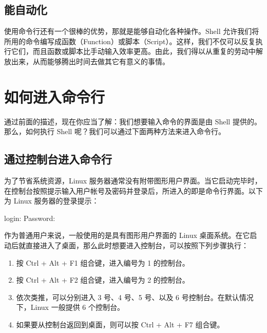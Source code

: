 \documentclass[]{ctexbook}
\newenvironment{Shaded}{\begin{snugshade}}{\end{snugshade}}
\newcommand{\ExtensionTok}[1]{#1}
\newcommand{\NormalTok}[1]{#1}
\begin{document}
\hypertarget{ux80fdux81eaux52a8ux5316}{%
\subsection{能自动化}\label{ux80fdux81eaux52a8ux5316}}

使用命令行还有一个很棒的优势，那就是能够自动化各种操作。Shell 允许我们将所用的命令编写成函数（Function）或脚本（Script）。这样，我们不仅可以反复执行它们，而且函数或脚本比手动输入效率更高。由此，我们得以从重复的劳动中解放出来，从而能够腾出时间去做其它有意义的事情。

\begin{Shaded}
\end{Shaded}

\hypertarget{ux5982ux4f55ux8fdbux5165ux547dux4ee4ux884c}{%
\section{如何进入命令行}\label{ux5982ux4f55ux8fdbux5165ux547dux4ee4ux884c}}

通过前面的描述，现在你应当了解：我们想要输入命令的界面是由 Shell 提供的。那么，如何执行 Shell 呢？我们可以通过下面两种方法来进入命令行。

\hypertarget{ux901aux8fc7ux63a7ux5236ux53f0ux8fdbux5165ux547dux4ee4ux884c}{%
\subsection{通过控制台进入命令行}\label{ux901aux8fc7ux63a7ux5236ux53f0ux8fdbux5165ux547dux4ee4ux884c}}

为了节省系统资源，Linux 服务器通常没有附带图形用户界面。当它启动完毕时，在控制台按照提示输入用户帐号及密码并登录后，所进入的即是命令行界面。以下为 Linux 服务器的登录提示：

\begin{Shaded}
\begin{Highlighting}[]
\ExtensionTok{login}\NormalTok{:}
\ExtensionTok{Password}\NormalTok{:}
\end{Highlighting}
\end{Shaded}

作为普通用户来说，一般使用的是具有图形用户界面的 Linux 桌面系统。在它启动后就直接进入了桌面，那么此时想要进入控制台，可以按照下列步骤执行：

\begin{enumerate}
\def\labelenumi{\arabic{enumi}.}
\item
  按 Ctrl + Alt + F1 组合键，进入编号为 1 的控制台。
\item
  按 Ctrl + Alt + F2 组合键，进入编号为 2 的控制台。
\item
  依次类推，可以分别进入 3 号、4 号、5 号、以及 6 号控制台。在默认情况下，Linux 一般提供 6 个控制台。
\item
  如果要从控制台返回到桌面，则可以按 Ctrl + Alt + F7 组合键。
\end{enumerate}
\end{document}
